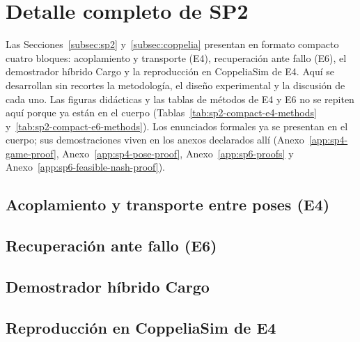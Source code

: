 \section{Detalle completo de SP2}
\label{app:sp2-full-detail}

Las Secciones~\ref{subsec:sp2} y~\ref{subsec:coppelia} presentan en formato
compacto cuatro bloques: acoplamiento y transporte (E4), recuperación ante
fallo (E6), el demostrador híbrido Cargo y la reproducción en CoppeliaSim de
E4. Aquí se desarrollan sin recortes la metodología, el diseño experimental y
la discusión de cada uno. Las figuras didácticas y las
tablas de métodos de E4 y E6 no se repiten aquí porque ya están en el cuerpo
(Tablas~\ref{tab:sp2-compact-e4-methods} y~\ref{tab:sp2-compact-e6-methods}).
Los enunciados formales ya se presentan en el cuerpo; sus demostraciones viven
en los anexos declarados allí (Anexo~\ref{app:sp4-game-proof},
Anexo~\ref{app:sp4-pose-proof}, Anexo~\ref{app:sp6-proofs} y
Anexo~\ref{app:sp6-feasible-nash-proof}).

\subsection{Acoplamiento y transporte entre poses (E4)}
\label{app:sp2-e4-full-detail}


\subsection{Recuperación ante fallo (E6)}
\label{app:sp2-e6-full-detail}


\subsection{Demostrador híbrido Cargo}
\label{app:sp2-cargo-full-detail}
\begingroup
\let\newcommand\renewcommand

\endgroup

\subsection{Reproducción en CoppeliaSim de E4}
\label{app:sp2-coppelia-full-detail}

